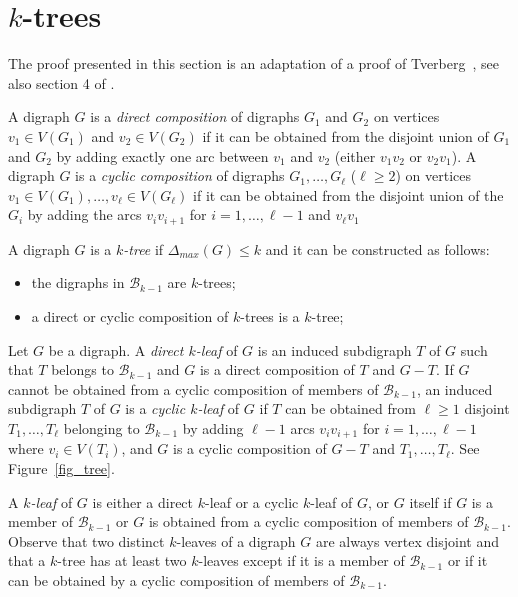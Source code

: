 \documentclass[11pt]{article}
\newcommand{\dmax}{\Delta_{max}}
\begin{document}

\section{$k$-trees}

The proof presented in this section is an adaptation of a proof of Tverberg~\cite{T83}, see also section 4 of \cite{CR14}. 

A digraph $G$ is a \emph{direct composition} of digraphs $G_{1}$ and $G_{2}$ on vertices $v_{1} \in V(G_{1})$ and $v_{2} \in V(G_{2})$ if it can be obtained from the disjoint union of $G_1$ and $G_2$ by adding exactly one arc between $v_1$ and $v_2$ (either $v_1v_2$ or $v_2v_1$). 
A digraph $G$ is a \emph{cyclic composition} of digraphs $G_{1}, \dots, G_{\ell}$ ($\ell \geq 2$) on vertices $v_{1} \in V(G_{1}), \dots, v_{\ell} \in V(G_{\ell})$ if it can be obtained from the disjoint union of the $G_{i}$ by adding  the arcs $v_iv_{i+1}$ for $i=1, \dots, \ell- 1$ and $v_{\ell}v_1$


A digraph $G$ is a \emph{$k$-tree} if $\dmax(G) \leq k$ and it can be constructed as follows:
\begin{itemize}
    \item the digraphs in $\mathcal B_{k-1}$ are $k$-trees;
    \item a  direct or cyclic composition of $k$-trees is a $k$-tree;
\end{itemize}



Let $G$ be a digraph. 
A \emph{direct $k$-leaf} of $G$ is an induced subdigraph $T$ of $G$ such that $T$ belongs to $\mathcal B_{k-1}$ and $G$ is a direct composition of $T$ and $G-T$. 
If $G$ cannot be obtained from a cyclic composition of members of $\mathcal B_{k-1}$, an induced subdigraph $T$ of $G$ is a  \emph{cyclic $k$-leaf} of $G$ if $T$ can be obtained from $\ell \geq 1$ disjoint  $T_1, \dots, T_{\ell}$ belonging to $\mathcal B_{k-1}$ by adding $\ell -1 $ arcs $v_iv_{i+1}$ for $i=1, \dots, \ell-1$ where $v_i \in V(T_i)$, and $G$ is a cyclic composition of $G - T$ and $T_1, \dots, T_{\ell}$. See Figure~\ref{fig_tree}. 

A \emph{$k$-leaf} of $G$ is either a direct $k$-leaf or a cyclic $k$-leaf of $G$, or $G$ itself if $G$ is a member of $\mathcal B_{k-1}$ or $G$ is obtained from a cyclic composition of members of $\mathcal B_{k-1}$.
Observe that two distinct $k$-leaves of a digraph $G$ are always vertex disjoint and that a $k$-tree has at least two $k$-leaves except if it is a member of $\mathcal B_{k-1}$ or if  it can be obtained by a cyclic composition of members of $\mathcal B_{k-1}$. 
\end{document}
